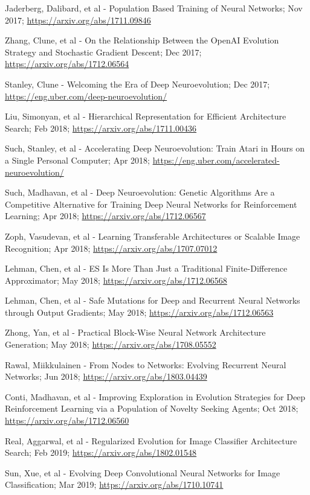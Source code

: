 \documentclass[journal, a4paper]{IEEEtran}
\begin{document}
\begin{thebibliography}{5}
    Jaderberg, Dalibard, et al - Population Based Training of Neural Networks; Nov 2017;
    \url{https://arxiv.org/abs/1711.09846}

    Zhang, Clune, et al - On the Relationship Between the OpenAI Evolution Strategy and Stochastic Gradient Descent; Dec 2017;
    \url{https://arxiv.org/abs/1712.06564}

    Stanley, Clune - Welcoming the Era of Deep Neuroevolution; Dec 2017;
    \url{https://eng.uber.com/deep-neuroevolution/}

    Liu, Simonyan, et al - Hierarchical Representation for Efficient Architecture Search; Feb 2018;
    \url{https://arxiv.org/abs/1711.00436}

    Such, Stanley, et al - Accelerating Deep Neuroevolution: Train Atari in Hours on a Single Personal Computer; Apr 2018;
    \url{https://eng.uber.com/accelerated-neuroevolution/}

    Such, Madhavan, et al - Deep Neuroevolution: Genetic Algorithms Are a Competitive Alternative for Training Deep Neural Networks for Reinforcement Learning; Apr 2018;
    \url{https://arxiv.org/abs/1712.06567}

    Zoph, Vasudevan, et al - Learning Transferable Architectures or Scalable Image Recognition; Apr 2018;
    \url{https://arxiv.org/abs/1707.07012}

    Lehman, Chen, et al - ES Is More Than Just a Traditional Finite-Difference Approximator; May 2018;
    \url{https://arxiv.org/abs/1712.06568}

    Lehman, Chen, et al - Safe Mutations for Deep and Recurrent Neural Networks through Output Gradients; May 2018;
    \url{https://arxiv.org/abs/1712.06563}

    Zhong, Yan, et al - Practical Block-Wise Neural Network Architecture Generation; May 2018;
    \url{https://arxiv.org/abs/1708.05552}

    Rawal, Miikkulainen - From Nodes to Networks: Evolving Recurrent Neural Networks; Jun 2018;
    \url{https://arxiv.org/abs/1803.04439}

    Conti, Madhavan, et al - Improving Exploration in Evolution Strategies for Deep Reinforcement Learning via a Population of Novelty Seeking Agents; Oct 2018;
    \url{https://arxiv.org/abs/1712.06560}

    Real, Aggarwal, et al - Regularized Evolution for Image Classifier Architecture Search; Feb 2019;
    \url{https://arxiv.org/abs/1802.01548}

    Sun, Xue, et al - Evolving Deep Convolutional Neural Networks for Image Classification; Mar 2019;
    \url{https://arxiv.org/abs/1710.10741}



\end{thebibliography}
\end{document}
